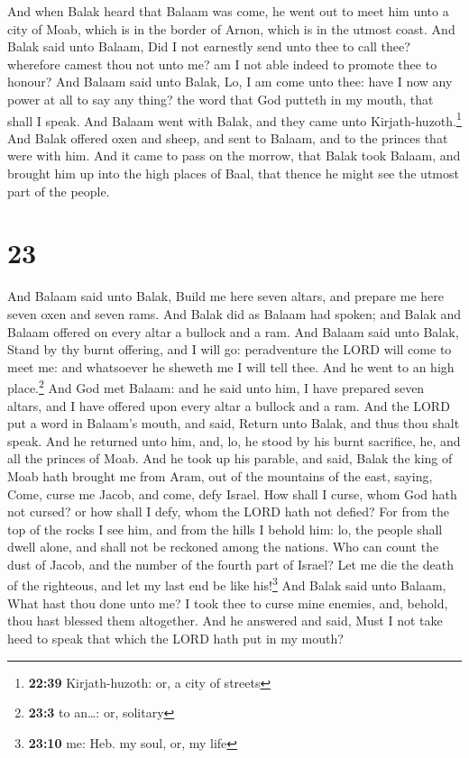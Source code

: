  And when Balak heard that Balaam was come, he went out
to meet him unto a city of Moab, which is in the border of Arnon, which
is in the utmost coast.  And Balak said unto Balaam, Did
I not earnestly send unto thee to call thee? wherefore camest thou not
unto me? am I not able indeed to promote thee to honour? 
And Balaam said unto Balak, Lo, I am come unto thee: have I now any
power at all to say any thing? the word that God putteth in my mouth,
that shall I speak.  And Balaam went with Balak, and they
came unto Kirjath-huzoth.\footnote{\textbf{22:39} Kirjath-huzoth: or, a
  city of streets}  And Balak offered oxen and sheep, and
sent to Balaam, and to the princes that were with him. 
And it came to pass on the morrow, that Balak took Balaam, and brought
him up into the high places of Baal, that thence he might see the utmost
part of the people.

\hypertarget{section-22}{%
\section{23}\label{section-22}}

 And Balaam said unto Balak, Build me here seven altars,
and prepare me here seven oxen and seven rams.  And Balak
did as Balaam had spoken; and Balak and Balaam offered on every altar a
bullock and a ram.  And Balaam said unto Balak, Stand by
thy burnt offering, and I will go: peradventure the LORD will come to
meet me: and whatsoever he sheweth me I will tell thee. And he went to
an high place.\footnote{\textbf{23:3} to an\ldots: or, solitary}
 And God met Balaam: and he said unto him, I have prepared
seven altars, and I have offered upon every altar a bullock and a ram.
 And the LORD put a word in Balaam's mouth, and said,
Return unto Balak, and thus thou shalt speak.  And he
returned unto him, and, lo, he stood by his burnt sacrifice, he, and all
the princes of Moab.  And he took up his parable, and
said, Balak the king of Moab hath brought me from Aram, out of the
mountains of the east, saying, Come, curse me Jacob, and come, defy
Israel.  How shall I curse, whom God hath not cursed? or
how shall I defy, whom the LORD hath not defied?  For from
the top of the rocks I see him, and from the hills I behold him: lo, the
people shall dwell alone, and shall not be reckoned among the nations.
 Who can count the dust of Jacob, and the number of the
fourth part of Israel? Let me die the death of the righteous, and let my
last end be like his!\footnote{\textbf{23:10} me: Heb. my soul, or, my
  life}  And Balak said unto Balaam, What hast thou done
unto me? I took thee to curse mine enemies, and, behold, thou hast
blessed them altogether.  And he answered and said, Must
I not take heed to speak that which the LORD hath put in my mouth?

